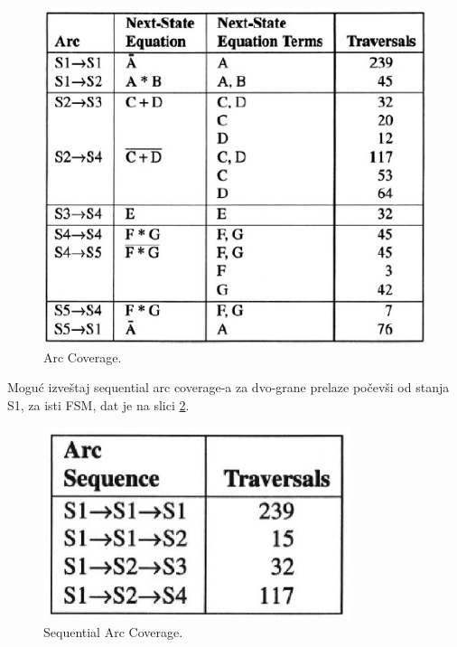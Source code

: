 \documentclass[a4paper, 12pt]{article}
\begin{document}
\begin{figure}[h!]
\centering
\includegraphics[scale=0.5]{img-arc-coverage.png}
\caption{Arc Coverage.}
\label{img-arc-coverage}
\end{figure}

\indent Moguć izveštaj sequential arc coverage-a za dvo-grane prelaze počevši od stanja S1, za isti FSM, dat je na slici \ref{img-sequential-arc-coverage}.

\begin{figure}[h!]
\centering
\includegraphics[scale=0.5]{img-sequential-arc-coverage.png}
\caption{Sequential Arc Coverage.}
\label{img-sequential-arc-coverage}
\end{figure}
\end{document}
